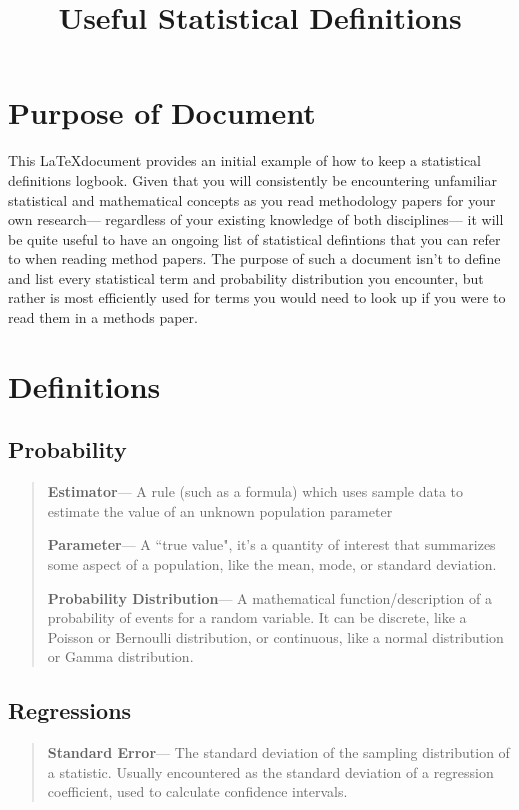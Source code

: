 \documentclass[12pt]{article}
\title{Useful Statistical Definitions}
\author{}
\date{}
\begin{document}
\maketitle

\section*{Purpose of Document}

\noindent This \LaTeX document provides an initial example of how to keep a statistical definitions logbook. Given that you will consistently be encountering unfamiliar statistical and mathematical concepts as you read methodology papers for your own research--- regardless of your existing knowledge of both disciplines--- it will be quite useful to have an ongoing list of statistical defintions that you can refer to when reading method papers. The purpose of such a document isn't to define and list every statistical term and probability distribution you encounter, but rather is most efficiently used for terms you would need to look up if you were to read them in a methods paper.

\section*{Definitions}
\subsection*{Probability}

\begin{quote}
\textbf{Estimator}--- A rule (such as a formula) which uses sample data to estimate the value of an unknown population parameter

\textbf{Parameter}--- A ``true value", it's a quantity of interest that summarizes some aspect of a population, like the mean, mode, or standard deviation. 

\textbf{Probability Distribution}--- A mathematical function/description of a probability of events for a random variable. It can be discrete, like a Poisson or Bernoulli distribution, or continuous, like a normal distribution or Gamma distribution.
\end{quote}

\subsection*{Regressions}

\begin{quote}
\textbf{Standard Error}--- The standard deviation of the sampling distribution of a statistic. Usually encountered as the standard deviation of a regression coefficient, used to calculate confidence intervals.
\end{quote}
\end{document}
